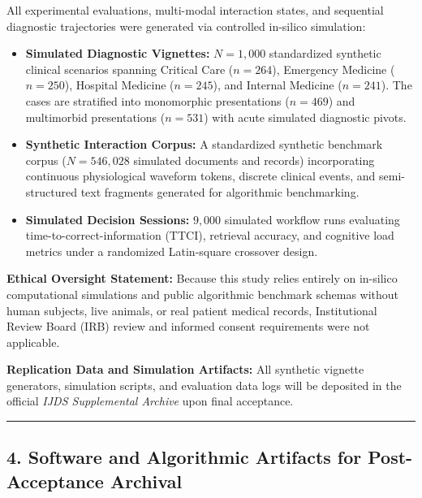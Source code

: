 \documentclass[11pt,letterpaper]{article}
\begin{document}
All experimental evaluations, multi-modal interaction states, and sequential diagnostic trajectories were generated via controlled in-silico simulation:
\begin{itemize}\setlength{\itemsep}{2pt}\setlength{\parskip}{0pt}
    \item \textbf{Simulated Diagnostic Vignettes:} $N = 1{,}000$ standardized synthetic clinical scenarios spanning Critical Care ($n=264$), Emergency Medicine ($n=250$), Hospital Medicine ($n=245$), and Internal Medicine ($n=241$). The cases are stratified into monomorphic presentations ($n=469$) and multimorbid presentations ($n=531$) with acute simulated diagnostic pivots.
    \item \textbf{Synthetic Interaction Corpus:} A standardized synthetic benchmark corpus ($N = 546{,}028$ simulated documents and records) incorporating continuous physiological waveform tokens, discrete clinical events, and semi-structured text fragments generated for algorithmic benchmarking.
    \item \textbf{Simulated Decision Sessions:} $9{,}000$ simulated workflow runs evaluating time-to-correct-information (TTCI), retrieval accuracy, and cognitive load metrics under a randomized Latin-square crossover design.
\end{itemize}

\textbf{Ethical Oversight Statement:}
Because this study relies entirely on in-silico computational simulations and public algorithmic benchmark schemas without human subjects, live animals, or real patient medical records, Institutional Review Board (IRB) review and informed consent requirements were not applicable.

\textbf{Replication Data and Simulation Artifacts:}
All synthetic vignette generators, simulation scripts, and evaluation data logs will be deposited in the official \textit{IJDS Supplemental Archive} upon final acceptance.

\vspace{4pt}
\hrule
\vspace{4pt}

\subsection*{4. Software and Algorithmic Artifacts for Post-Acceptance Archival}
\end{document}
